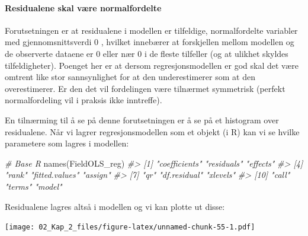 \documentclass[
]{article}
\newenvironment{Shaded}{\begin{snugshade}}{\end{snugshade}}
\newcommand{\CommentTok}[1]{\textcolor[rgb]{0.56,0.35,0.01}{\textit{#1}}}
\newcommand{\FunctionTok}[1]{\textcolor[rgb]{0.00,0.00,0.00}{#1}}
\newcommand{\NormalTok}[1]{#1}
\newcommand{\OtherTok}[1]{\textcolor[rgb]{0.56,0.35,0.01}{#1}}
\newcommand{\SpecialCharTok}[1]{\textcolor[rgb]{0.00,0.00,0.00}{#1}}
\begin{document}
\hypertarget{residualene-skal-vuxe6re-normalfordelte}{%
\paragraph{Residualene skal være normalfordelte}\label{residualene-skal-vuxe6re-normalfordelte}}

Forutsetningen er at residualene i modellen er tilfeldige, normalfordelte variabler med gjennomsnittsverdi 0 \citep{fieldDiscoveringStatisticsUsing2012}, hvilket innebærer at forskjellen mellom modellen og de observerte dataene er 0 eller nær 0 i de fleste tilfeller (og at ulikhet skyldes tilfeldigheter). Poenget her er at dersom regresjonsmodellen er god skal det være omtrent like stor sannsynlighet for at den underestimerer som at den overestimerer. Er den det vil fordelingen være tilnærmet symmetrisk (perfekt normalfordeling vil i praksis ikke inntreffe).

En tilnærming til å se på denne forutsetningen er å se på et histogram over residualene. Når vi lagrer regresjonsmodellen som et objekt (i R) kan vi se hvilke parametere som lagres i modellen:

\begin{Shaded}
\begin{Highlighting}[]
\CommentTok{\# Base R}
\FunctionTok{names}\NormalTok{(FieldOLS\_reg)}
\CommentTok{\#\textgreater{}  [1] "coefficients"  "residuals"     "effects"      }
\CommentTok{\#\textgreater{}  [4] "rank"          "fitted.values" "assign"       }
\CommentTok{\#\textgreater{}  [7] "qr"            "df.residual"   "xlevels"      }
\CommentTok{\#\textgreater{} [10] "call"          "terms"         "model"}
\end{Highlighting}
\end{Shaded}

Residualene lagres altså i modellen og vi kan plotte ut disse:

\begin{Shaded}
\end{Shaded}

\texttt{[image: 02\_Kap\_2\_files/figure-latex/unnamed-chunk-55-1.pdf]}
\end{document}
